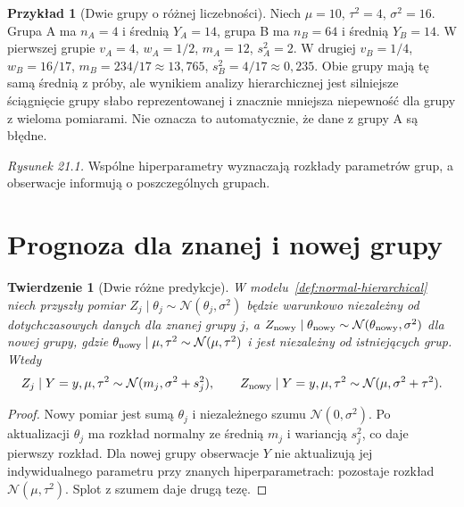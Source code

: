 \documentclass[11pt,a4paper,oneside]{report}
\numberwithin{equation}{chapter}
\theoremstyle{plain}
\newtheorem{twierdzenie}{Twierdzenie}[chapter]
\theoremstyle{definition}
\newtheorem{przyklad}{Przykład}[chapter]
\theoremstyle{remark}
\newcommand{\Normal}{\mathcal N}
\begin{document}
\begin{przyklad}[Dwie grupy o różnej liczebności]
Niech $\mu=10$, $\tau^2=4$, $\sigma^2=16$.
Grupa A ma $n_A=4$ i średnią $Y_A=14$, grupa B ma
$n_B=64$ i średnią $Y_B=14$. W pierwszej grupie
$v_A=4$, $w_A=1/2$, $m_A=12$, $s_A^2=2$.
W drugiej $v_B=1/4$, $w_B=16/17$, $m_B=234/17\approx13{,}765$,
$s_B^2=4/17\approx0{,}235$.
Obie grupy mają tę samą średnią z próby, ale wynikiem
analizy hierarchicznej jest silniejsze ściągnięcie grupy
słabo reprezentowanej i znacznie mniejsza niepewność
dla grupy z wieloma pomiarami. Nie oznacza to automatycznie,
że dane z grupy A są błędne.
\end{przyklad}


\Needspace{92mm}
\begin{center}

{\small\emph{Rysunek 21.1.} Wspólne hiperparametry wyznaczają rozkłady parametrów grup, a obserwacje informują o poszczególnych grupach.}
\end{center}

\section{Prognoza dla znanej i nowej grupy}
\begin{twierdzenie}[Dwie różne predykcje]
\label{thm:hierarchical-predictive}
W modelu~\ref{def:normal-hierarchical} niech przyszły pomiar
$Z_j\mid\theta_j\sim\Normal(\theta_j,\sigma^2)$ będzie warunkowo
niezależny od dotychczasowych danych dla znanej grupy $j$,
a $Z_{\rm nowy}\mid\theta_{\rm nowy}\sim\Normal(\theta_{\rm nowy},\sigma^2)$
dla nowej grupy, gdzie $\theta_{\rm nowy}\mid\mu,\tau^2\sim\Normal(\mu,\tau^2)$
i jest niezależny od istniejących grup. Wtedy
\[
 Z_j\mid Y=y,\mu,\tau^2\sim\Normal(m_j,\sigma^2+s_j^2),
 \qquad Z_{\rm nowy}\mid Y=y,\mu,\tau^2\sim\Normal(\mu,\sigma^2+\tau^2).
\]
\end{twierdzenie}
\begin{proof}
Nowy pomiar jest sumą $\theta_j$ i niezależnego
szumu $\Normal(0,\sigma^2)$. Po aktualizacji $\theta_j$
ma rozkład normalny ze średnią $m_j$ i wariancją $s_j^2$,
co daje pierwszy rozkład. Dla nowej grupy obserwacje
$Y$ nie aktualizują jej indywidualnego parametru przy
znanych hiperparametrach: pozostaje rozkład
$\Normal(\mu,\tau^2)$. Splot z szumem daje drugą tezę.
\end{proof}
\end{document}
